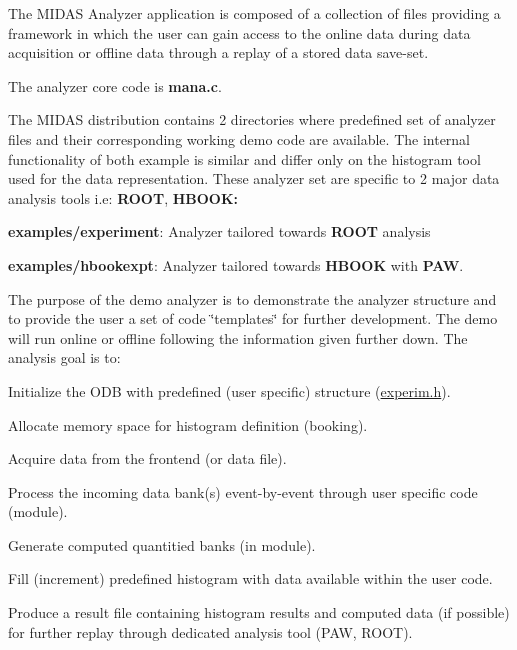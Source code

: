 \begin{DoxyItemize}
\item The MIDAS Analyzer application is composed of a collection of files providing a framework in which the user can gain access to the online data during data acquisition or offline data through a replay of a stored data save-\/set.
\end{DoxyItemize}


\begin{DoxyItemize}
\item The analyzer core code is {\bfseries mana.c}.
\end{DoxyItemize}


\begin{DoxyItemize}
\item The MIDAS distribution contains 2 directories where predefined set of analyzer files and their corresponding working demo code are available. The internal functionality of both example is similar and differ only on the histogram tool used for the data representation. These analyzer set are specific to 2 major data analysis tools i.e: {\bfseries ROOT}, {\bfseries HBOOK:} 
\begin{DoxyItemize}
\item {\bfseries examples/experiment}: Analyzer tailored towards {\bfseries ROOT} analysis
\item {\bfseries examples/hbookexpt}: Analyzer tailored towards {\bfseries HBOOK} with {\bfseries PAW}.
\end{DoxyItemize}
\end{DoxyItemize}


\begin{DoxyItemize}
\item The purpose of the demo analyzer is to demonstrate the analyzer structure and to provide the user a set of code \char`\"{}templates\char`\"{} for further development. The demo will run online or offline following the information given further down. The analysis goal is to:
\begin{DoxyEnumerate}
\item Initialize the ODB with predefined (user specific) structure (\hyperlink{experim_8h}{experim.h}).
\item Allocate memory space for histogram definition (booking).
\item Acquire data from the frontend (or data file).
\item Process the incoming data bank(s) event-\/by-\/event through user specific code (module).
\item Generate computed quantitied banks (in module).
\item Fill (increment) predefined histogram with data available within the user code.
\item Produce a result file containing histogram results and computed data (if possible) for further replay through dedicated analysis tool (PAW, ROOT).
\end{DoxyEnumerate}
\end{DoxyItemize}



